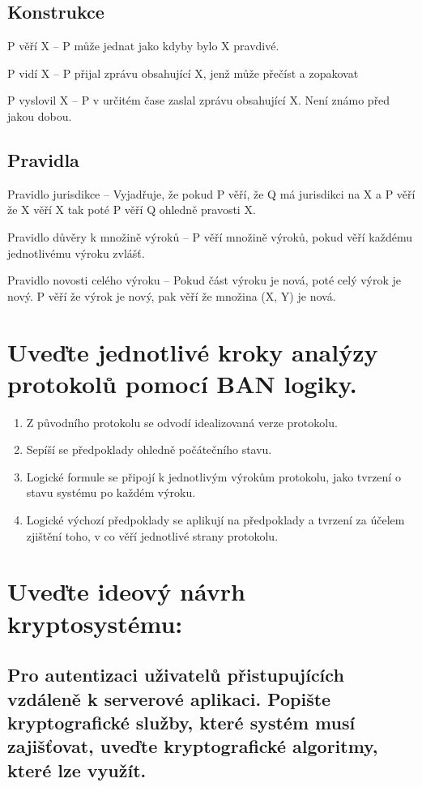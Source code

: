 \subsection{Konstrukce}

P věří X -- P může jednat jako kdyby bylo X pravdivé.

P vidí X -- P přijal zprávu obsahující X, jenž může přečíst a zopakovat

P vyslovil X -- P v určitém čase zaslal zprávu obsahující X. Není známo před jakou dobou.

\subsection{Pravidla}

Pravidlo jurisdikce -- Vyjadřuje, že pokud P věří, že Q má jurisdikci na X a P věří že X věří X tak poté P věří Q ohledně pravosti X.

Pravidlo důvěry k množině výroků -- P věří množině výroků, pokud věří každému jednotlivému výroku zvlášť.

Pravidlo novosti celého výroku -- Pokud část výroku je nová, poté celý výrok je nový. P věří že výrok je nový, pak věří že množina (X, Y) je nová.

\section{Uveďte jednotlivé kroky analýzy protokolů pomocí BAN logiky.}

\begin{enumerate}
    \item Z původního protokolu se odvodí idealizovaná verze protokolu.
    \item Sepíší se předpoklady ohledně počátečního stavu.
    \item Logické formule se připojí k jednotlivým výrokům protokolu, jako tvrzení o stavu systému po každém výroku.
    \item Logické výchozí předpoklady se aplikují na předpoklady a tvrzení za účelem zjištění toho, v co věří jednotlivé strany protokolu.
\end{enumerate}

\section{Uveďte ideový návrh kryptosystému:}
\subsection{Pro autentizaci uživatelů přistupujících vzdáleně k serverové aplikaci. Popište kryptografické služby, které systém musí zajišťovat, uveďte kryptografické algoritmy, které lze využít.}


